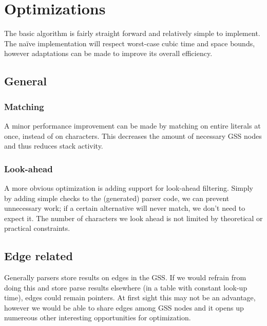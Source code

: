 \documentclass[a4paper,10pt]{article}
\begin{document}
\section{Optimizations}

The basic algorithm is fairly straight forward and relatively simple to implement. The naïve implementation will respect worst-case cubic time and space bounds, however adaptations can be made to improve its overall efficiency.

\subsection{General}

\subsubsection{Matching}
A minor performance improvement can be made by matching on entire literals at once, instead of on characters. This decreases the amount of necessary GSS nodes and thus reduces stack activity.

\subsubsection{Look-ahead}
A more obvious optimization is adding support for look-ahead filtering. Simply by adding simple checks to the (generated) parser code, we can prevent unnecessary work; if a certain alternative will never match, we don't need to expect it. The number of characters we look ahead is not limited by theoretical or practical constraints.

\subsection{Edge related}

Generally parsers store results on edges in the GSS. If we would refrain from doing this and store parse results elsewhere (in a table with constant look-up time), edges could remain pointers. At first sight this may not be an advantage, however we would be able to share edges among GSS nodes and it opens up numereous other interesting opportunities for optimization.
\end{document}
